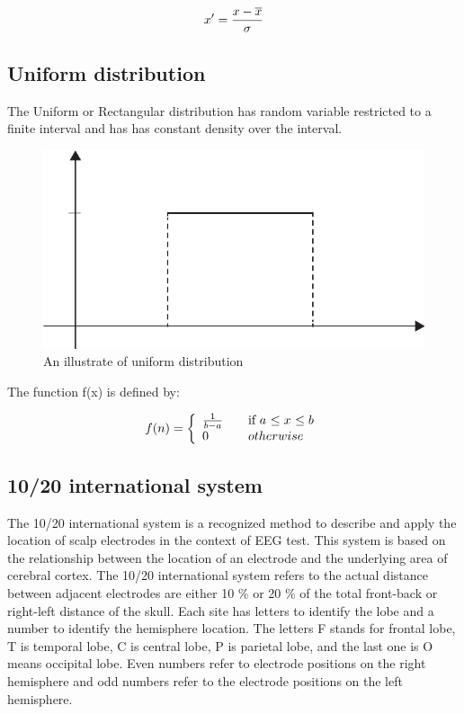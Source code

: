 \[x' = {x-{\overline{x}} \over {\sigma}}\]

\subsection{Uniform distribution\cite{ref11}}

\hspace{1.5cm} The Uniform or Rectangular distribution has random variable  restricted to a finite interval  and has  has constant density over the interval.
\begin{figure}[h]
	\centering
	\includegraphics[scale = 0.8]{chapter3/34.pdf}
	\caption{An illustrate of uniform distribution}
\end{figure}

\newpage
The function f(x) is defined by:

\[f(n) = \left\{ 
\begin{array}{l l}
  {1 \over b-a} & \quad \mbox{if $a$ $\leq x$ $\leq b$}\\
  0 & \quad \mbox{$otherwise$}\\ \end{array} \right. \]

\subsection{10/20 international system}
\hspace{1.5cm} The 10/20 international system is a recognized method to describe and apply the location of scalp electrodes in the context of EEG test. This system is based on the relationship between the location of an electrode and the underlying area of cerebral cortex. The 10/20 international system refers to the actual distance between adjacent electrodes are either 10 \% or 20 \% of the total front-back or right-left distance of the skull. Each site has letters to identify the lobe and a number to identify the hemisphere location. The letters F stands for frontal lobe, T is temporal lobe, C is central lobe, P is parietal lobe, and the last one is O means occipital lobe. Even numbers refer to electrode positions on the right hemisphere and odd numbers refer to the electrode positions on the left hemisphere.

